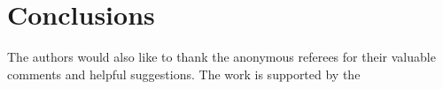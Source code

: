\section{Conclusions}
\label{conclusions}

\begin{acks}

  The authors would also like to thank the anonymous referees for
  their valuable comments and helpful suggestions. The work is
  supported by the 
\end{acks}
